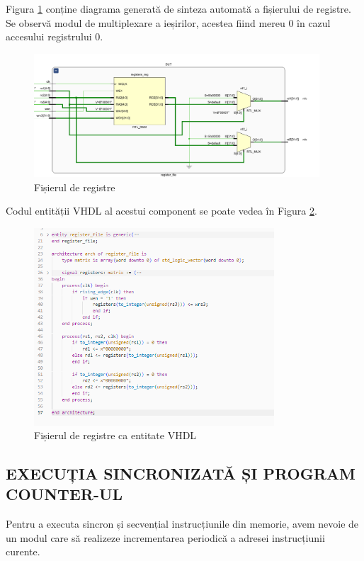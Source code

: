 \documentclass[12pt]{article}
\begin{document}
  \newpage  
  Figura \ref{Figura:34} conține diagrama generată de sinteza automată a fișierului de registre. Se observă modul de multiplexare a ieșirilor, acestea fiind mereu 0 în cazul accesului registrului 0.
 
  \begin{figure}[h!]
 \includegraphics[width=0.95\textwidth]{regfile.png}
 \centering
 \caption{Fișierul de registre}
 \label{Figura:34}
 \end{figure}
 
Codul entității VHDL al acestui component se poate vedea în Figura \ref{Figura:35}.

  \begin{figure}[h!]
 \includegraphics[width=0.8\textwidth]{regfilecode.png}
 \centering
 \caption{Fișierul de registre ca entitate VHDL}
 \label{Figura:35}
 \end{figure}
 
\newpage
\subsection{EXECUȚIA SINCRONIZATĂ ȘI PROGRAM COUNTER-UL}

Pentru a executa sincron și secvențial instrucțiunile din memorie, avem nevoie de un modul care să realizeze incrementarea periodică a adresei instrucțiunii curente.
\end{document}
